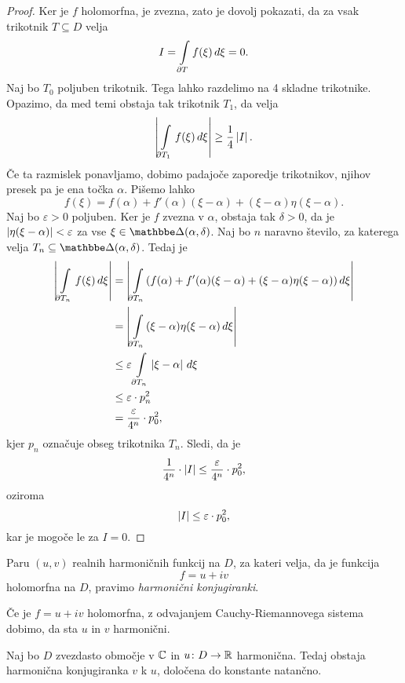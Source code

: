 \begin{proof}
Ker je $f$ holomorfna, je zvezna, zato je dovolj pokazati, da za
vsak trikotnik $T \subseteq D$ velja
\[
I = \int\limits_{\partial T} f(\xi)\,d\xi = 0.
\]
Naj bo $T_0$ poljuben trikotnik. Tega lahko razdelimo na 4 skladne
trikotnike. Opazimo, da med temi obstaja tak trikotnik $T_1$, da
velja
\[
\left\lvert \int\limits_{\partial T_1} f(\xi)\,d\xi\right\rvert \geq \frac{1}{4} \left\lvert I\right\rvert.
\]
Če ta razmislek ponavljamo, dobimo padajoče zaporedje trikotnikov,
njihov presek pa je ena točka $\alpha$. Pišemo lahko
\[
f(\xi) = f(\alpha) + f'(\alpha)(\xi - \alpha) +
(\xi - \alpha) \eta(\xi - \alpha).
\]
Naj bo $\varepsilon > 0$ poljuben. Ker je $f$ zvezna v $\alpha$,
obstaja tak $\delta > 0$, da je
$\left\lvert \eta(\xi - \alpha)\right\rvert < \varepsilon$ za vse
$\xi \in \dsk(\alpha, \delta)$. Naj bo $n$ naravno število, za
katerega velja $T_n \subseteq \dsk(\alpha, \delta)$. Tedaj je
\begin{align*}
\left\lvert \int\limits_{\partial T_n} f(\xi)\,d\xi\right\rvert
&=
\left\lvert \int\limits_{\partial T_n} (f(\alpha) + f'(\alpha)(\xi - \alpha) +
(\xi - \alpha) \eta(\xi - \alpha))\,d\xi\right\rvert
\\
&=
\left\lvert \int\limits_{\partial T_n} (\xi - \alpha) \eta(\xi - \alpha)\,d\xi\right\rvert
\\
&\leq
\varepsilon \int\limits_{\partial T_n} \left\lvert \xi - \alpha\right\rvert\,d\xi
\\
&\leq
\varepsilon \cdot p_n^2
\\
&=
\frac{\varepsilon}{4^n} \cdot p_0^2,
\end{align*}
kjer $p_n$ označuje obseg trikotnika $T_n$. Sledi, da je
\[
\frac{1}{4^n} \cdot \left\lvert I\right\rvert \leq
\frac{\varepsilon}{4^n} \cdot p_0^2,
\]
oziroma
\[
\left\lvert I\right\rvert \leq \varepsilon \cdot p_0^2,
\]
kar je mogoče le za $I = 0$.
\end{proof}

\begin{definicija}
Paru $(u, v)$ realnih harmoničnih funkcij na $D$, za kateri velja,
da je funkcija
\[
f = u + iv
\]
holomorfna na $D$, pravimo
\emph{harmonični konjugiranki}.
\end{definicija}

\begin{opomba}
Če je $f = u + iv$ holomorfna, z odvajanjem Cauchy-Riemannovega
sistema dobimo, da sta $u$ in $v$ harmonični.
\end{opomba}

\begin{trditev}
Naj bo $D$ zvezdasto območje v $\mathbb{C}$ in $u \colon D \to \mathbb{R}$
harmonična. Tedaj obstaja harmonična konjugiranka $v$ k $u$,
določena do konstante natančno.
\end{trditev}

